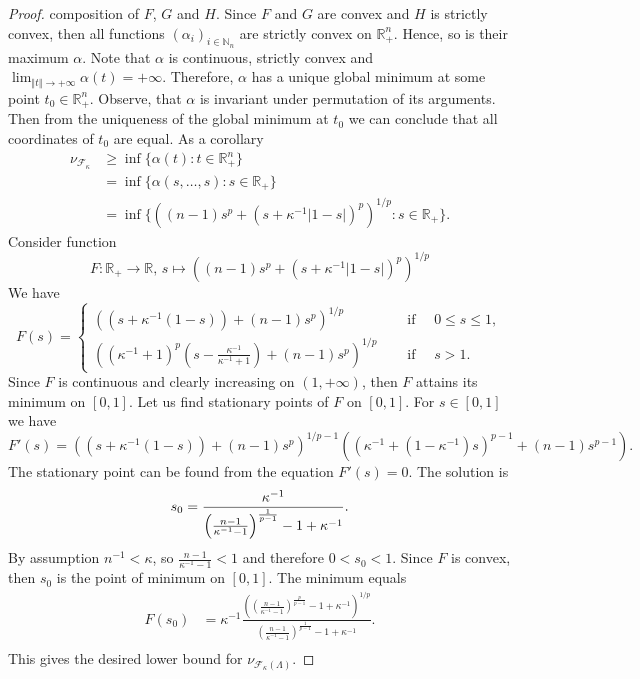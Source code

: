 \documentclass[12pt]{article}
\begin{document}
\begin{proof}
    composition of $F$, $G$ and $H$. Since $F$ and $G$ are convex 
    and $H$ is strictly convex, then all 
    functions $(\alpha_i)_{i\in\mathbb{N}_n}$ are strictly convex 
    on $\mathbb{R}_+^n$. Hence, so is their maximum $\alpha$. Note 
    that $\alpha$ is continuous, strictly convex 
    and $\lim_{\Vert t\Vert\to+\infty}\alpha(t)=+\infty$. 
    Therefore, $\alpha$ has a unique global minimum at some 
    point $t_0\in\mathbb{R}_+^n$. Observe, that $\alpha$ is invariant under 
    permutation of its arguments. Then from the uniqueness of the global minimum 
    at $t_0$ we can conclude that all coordinates of $t_0$ are equal. 
    As a corollary
    \[
    \begin{aligned}
        \nu_{\mathcal{F}_{\kappa}}
        &\geq\inf\{\alpha(t) : t\in\mathbb{R}_+^n\} \\
        &=\inf\{\alpha(s,\ldots,s) : s\in\mathbb{R}_+\} \\
        &=\inf\{((n-1)s^p+(s+\kappa^{-1}|1-s|)^p)^{1/p} : s\in\mathbb{R}_+\}.
    \end{aligned}
    \]
    Consider function
    \[
        F:\mathbb{R}_+\to\mathbb{R},\,
        s\mapsto ((n-1)s^p+(s+\kappa^{-1}|1-s|)^p)^{1/p}
    \]
    We have 
    \[
        F(s)=
        \begin{cases}
            ((s+\kappa^{-1}(1-s))+(n-1)s^p)^{1/p}
            \quad&\mbox{ if }\quad 0\leq s\leq 1, \\
            \left(
                (\kappa^{-1}+1)^p
                \left(s-\frac{\kappa^{-1}}{\kappa^{-1}+1}\right)+
                (n-1)s^p
            \right)^{1/p}
            \quad&\mbox{ if }\quad s>1.
        \end{cases}
    \]
    Since $F$ is continuous and clearly increasing on $(1,+\infty)$, 
    then $F$ attains its minimum on $[0, 1]$. Let us find stationary points 
    of $F$ on $[0, 1]$. For $s\in[0,1]$ we have
    \[
        F'(s)=
        ((s+\kappa^{-1}(1-s))+(n-1)s^p)^{1/p-1}
        ((\kappa^{-1}+(1-\kappa^{-1})s)^{p-1}+(n-1)s^{p-1}).
    \]
    The stationary point can be found from the equation $F'(s)=0$. 
    The solution is
    \[
        s_0
        =\frac{
            \kappa^{-1}
        }{
            \left(
                \frac{n-1}{\kappa^{-1}-1}
            \right)^{\frac{1}{p-1}}
            -1+\kappa^{-1}
        }.\\
    \]
    By assumption $n^{-1}<\kappa$, so $\frac{n-1}{\kappa^{-1}-1}<1$ and 
    therefore $0<s_0<1$. Since $F$ is convex, then $s_0$ is the point of 
    minimum on $[0,1]$. The minimum equals
    \[
    \begin{aligned}
        F(s_0)
        &=\kappa^{-1}
            \frac{
                \left(
                    \left(\frac{n-1}{\kappa^{-1}-1}
                    \right)^{\frac{p}{p-1}}
                    -1+\kappa^{-1}
                \right)^{1/p}
            }{
                \left(\frac{n-1}{\kappa^{-1}-1}
                \right)^{\frac{1}{p-1}}
                -1+\kappa^{-1}
            }. \\
    \end{aligned}
    \]
    This gives the desired lower bound 
    for $\nu_{\mathcal{F}_{\kappa}(\Lambda)}$.
\end{proof}
\end{document}
